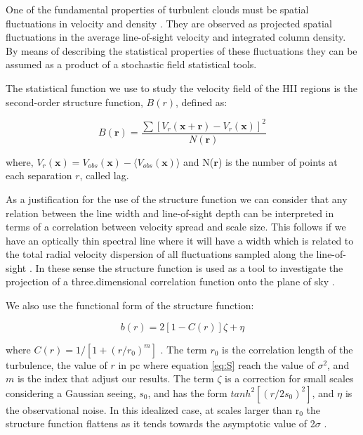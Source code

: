 \documentclass[fleqn,usenatbib, useAMS, a4paper]{mnras}
\begin{document}
One of the fundamental properties of turbulent clouds must be spatial fluctuations in velocity and density \citep{1984ApJ...277..556S}.
They are observed as projected spatial fluctuations in the average line-of-sight velocity and integrated column density.
By means of describing the statistical properties of these fluctuations they can be assumed as a product of a stochastic field statistical tools.

The statistical function we use to study the velocity field of the HII regions is the second-order structure function, $B(r)$, defined as:

\begin{equation}\label{eq:S}
B(\boldsymbol{r})=\dfrac{\sum[V_{r}(\boldsymbol{x}+\boldsymbol{r})-V_{r}(\boldsymbol{x}) ]^{2}}{N(\boldsymbol{r})}
\end{equation}

where, $V_{r}(\boldsymbol{x})= V_{obs}(\boldsymbol{x})-\langle V_{obs}(\boldsymbol{x}) \rangle$ and N($\boldsymbol{r}$) is the number of points at each separation \(r\), called lag.

As a justification for the use of the structure function we can consider that any relation between the line width and line-of-sight depth can be interpreted in terms of a correlation between velocity spread and scale size.
This follows if we have an optically thin spectral line where it will have a width which is related to the total radial velocity dispersion of all fluctuations sampled along the line-of-sight \citep{1984ApJ...277..556S}. 
In these sense the structure function is used as a tool to investigate the projection of a three.dimensional correlation function onto the plane of sky \citep{arthur2016turbulence}.

We also use the functional form of the structure function:

\begin{equation}\label{eq:b}
b(r)=2[1-C(r)]\zeta+\eta
\end{equation}

where $C(r)=1/[1+(r/r_{0})^{m}]$ \citep{1984ApJ...277..556S,arthur2016turbulence}.
The term $r_{0}$ is the correlation length of the turbulence, the value of \(r\) in pc where equation \ref{eq:S} reach the value of \(\sigma^2\), and $m$ is the index that adjust our results.
The term $\zeta$ is a correction for small scales considering a Gaussian seeing, $s_{0}$, and has the form $tanh^{2}[(r/2s_{0})^2]$, and \(\eta\) is the observational noise. 
In this idealized case, at scales larger than r$_{0}$ the structure function flattens as it tends towards the asymptotic value of 2$\sigma$ \citep{arthur2016turbulence}.
\end{document}
